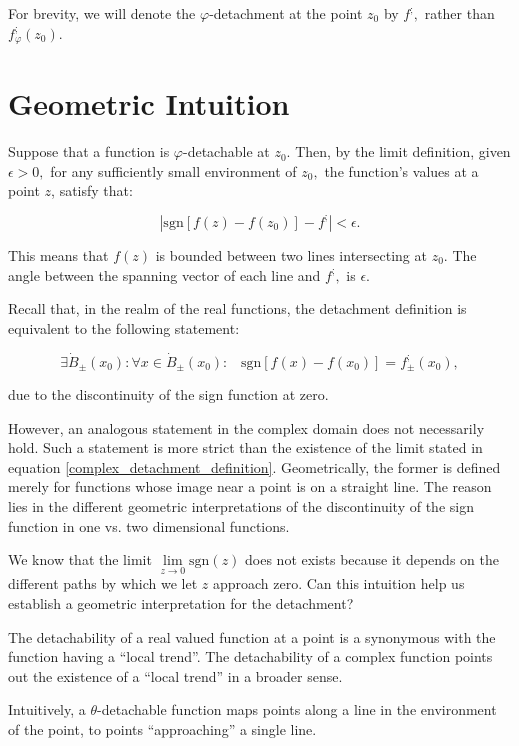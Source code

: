 \documentclass[11pt]{book}
\begin{document}
For brevity, we will denote the $\varphi$-detachment at the point $z_{0}$ by $f^{;},$ rather than $f_{\varphi}^{;}\left(z_{0}\right)$.

\section{Geometric Intuition}
Suppose that a function is $\varphi$-detachable at $z_{0}.$ Then, by the limit definition, given $\epsilon>0,$ for any sufficiently small environment of $z_{0},$ the function's values at a point $z$, satisfy that:

$$\left|\text{sgn}\left[f\left(z\right)-f\left(z_{0}\right)\right]-f^{;}\right|<\epsilon.$$

This means that $f\left(z\right)$ is bounded between two lines intersecting at $z_{0}.$ The angle between the spanning vector of each line and $f^{;},$ is $\epsilon.$

Recall that, in the realm of the real functions, the detachment definition is equivalent to the following statement:

$$\exists\dot{B}_{\pm}\left(x_{0}\right):\forall x\in\dot{B}_{\pm}\left(x_{0}\right):\,\,\,\,\,\text{sgn}\left[f\left(x\right)-f\left(x_{0}\right)\right]=f_{\pm}^{;}\left(x_{0}\right),$$

due to the discontinuity of the sign function at zero.

However, an analogous statement in the complex domain does not necessarily hold. Such a statement is more strict than the existence of the limit stated in equation \ref{complex_detachment_definition}. Geometrically, the former is defined merely for functions whose image near a point is on a straight line. The reason lies in the different geometric interpretations of the discontinuity of the sign function in one vs. two dimensional functions.

We know that the limit $\underset{z\to0}{\lim}\text{sgn}\left(z\right)$ does not exists because it depends on the different paths by which we let $z$ approach zero. Can this intuition help us establish a geometric interpretation for the detachment?

The detachability of a real valued function at a point is a synonymous with the function having a “local trend”. The detachability of a complex function points out the existence of a “local trend” in a broader sense.

Intuitively, a $\theta$-detachable function maps points along a line in the environment of the point, to points “approaching” a single line.
\end{document}
